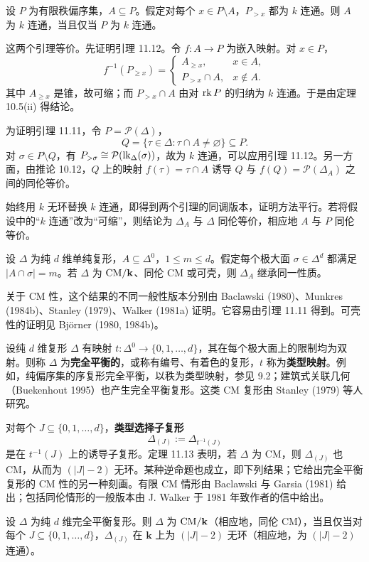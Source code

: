 设 $P$ 为有限秩偏序集，$A\subseteq P$。假定对每个 $x\in P\setminus A$，$P_{>x}$ 都为 $k$ 连通。则 $A$ 为 $k$ 连通，当且仅当 $P$ 为 $k$ 连通。

\begin{proofcn}
这两个引理等价。先证明引理 11.12。令 $f:A\to P$ 为嵌入映射。对 $x\in P$，
\[
f^{-1}(P_{\ge x})=
\begin{cases}
A_{\ge x},&x\in A,\\
P_{>x}\cap A,&x\notin A.
\end{cases}
\]
其中 $A_{\ge x}$ 是锥，故可缩；而 $P_{>x}\cap A$ 由对 $\operatorname{rk} P$ 的归纳为 $k$ 连通。于是由定理 10.5(ii) 得结论。

为证明引理 11.11，令 $P=\mathcal P(\Delta)$，
\[
Q=\{\tau\in\Delta:\tau\cap A\ne\varnothing\}\subseteq P.
\]
对 $\sigma\in P\setminus Q$，有 $P_{>\sigma}\cong\mathcal P(\operatorname{lk}_\Delta(\sigma))$，故为 $k$ 连通，可以应用引理 11.12。另一方面，由推论 10.12，$Q$ 上的映射 $f(\tau)=\tau\cap A$ 诱导 $Q$ 与 $f(Q)=\mathcal P(\Delta_A)$ 之间的同伦等价。
\end{proofcn}

始终用 $k$ 无环替换 $k$ 连通，即得到两个引理的同调版本，证明方法平行。若将假设中的“$k$ 连通”改为“可缩”，则结论为 $\Delta_A$ 与 $\Delta$ 同伦等价，相应地 $A$ 与 $P$ 同伦等价。

设 $\Delta$ 为纯 $d$ 维单纯复形，$A\subseteq\Delta^0$，$1\le m\le d$。假定每个极大面 $\sigma\in\Delta^d$ 都满足 $|A\cap\sigma|=m$。若 $\Delta$ 为 $\mathrm{CM}/\mathbf k$、同伦 CM 或可壳，则 $\Delta_A$ 继承同一性质。

关于 CM 性，这个结果的不同一般性版本分别由 Baclawski (1980)、Munkres (1984b)、Stanley (1979)、Walker (1981a) 证明。它容易由引理 11.11 得到。可壳性的证明见 Björner (1980, 1984b)。

设纯 $d$ 维复形 $\Delta$ 有映射 $t:\Delta^0\to\{0,1,\ldots,d\}$，其在每个极大面上的限制均为双射。则称 $\Delta$ 为\textbf{完全平衡的}，或称有编号、有着色的复形，$t$ 称为\textbf{类型映射}。例如，纯偏序集的序复形完全平衡，以秩为类型映射，参见 9.2；建筑式关联几何（Buekenhout 1995）也产生完全平衡复形。这类 CM 复形由 Stanley (1979) 等人研究。

对每个 $J\subseteq\{0,1,\ldots,d\}$，\textbf{类型选择子复形}
\[
\Delta_{(J)}:=\Delta_{t^{-1}(J)}
\]
是在 $t^{-1}(J)$ 上的诱导子复形。定理 11.13 表明，若 $\Delta$ 为 CM，则 $\Delta_{(J)}$ 也 CM，从而为 $(|J|-2)$ 无环。某种逆命题也成立，即下列结果；它给出完全平衡复形的 CM 性的另一种刻画。有限 CM 情形由 Baclawski 与 Garsia (1981) 给出；包括同伦情形的一般版本由 J. Walker 于 1981 年致作者的信中给出。

设 $\Delta$ 为纯 $d$ 维完全平衡复形。则 $\Delta$ 为 $\mathrm{CM}/\mathbf k$（相应地，同伦 CM），当且仅当对每个 $J\subseteq\{0,1,\ldots,d\}$，$\Delta_{(J)}$ 在 $\mathbf k$ 上为 $(|J|-2)$ 无环（相应地，为 $(|J|-2)$ 连通）。
